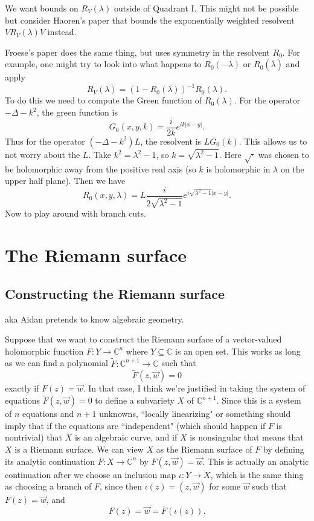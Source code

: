 \documentclass[12pt]{report}
\newcommand{\CC}{\mathbb{C}}
\theoremstyle{definition}
\begin{document}
We want bounds on $R_V(\lambda)$ outside of Quadrant I. This might not be possible but consider Haoren's paper that bounds the exponentially weighted resolvent $VR_V(\lambda)V$ instead.

Froese's paper does the same thing, but uses symmetry in the resolvent $R_0$.
For example, one might try to look into what happens to $R_0(-\lambda)$ or $R_0(\overline\lambda)$ and apply
$$R_V(\lambda) = (1 - R_0(\lambda))^{-1}R_0(\lambda).$$
To do this we need to compute the Green function of $R_0(\lambda)$. For the operator $-\Delta - k^2$, the green function is
$$G_0(x, y, k) = \frac{i}{2k}e^{ik|x-y|}.$$
Thus for the operator $(-\Delta - k^2)L$, the resolvent is $LG_0(k)$.
This allows us to not worry about the $L$.
Take $k^2 = \lambda^2 - 1$, so $k = \sqrt{\lambda^2 - 1}$. Here $\sqrt\cdot$ was chosen to be holomorphic away from the positive real axis (so $k$ is holomorphic in $\lambda$ on the upper half plane).
Then we have
$$R_0(x, y, \lambda) = L\frac{i}{2\sqrt{\lambda^2 - 1}}e^{i\sqrt{\lambda^2 - 1}|x-y|}.$$
Now to play around with branch cuts.


\chapter{The Riemann surface}
\section{Constructing the Riemann surface}
aka Aidan pretends to know algebraic geometry.

Suppose that we want to construct the Riemann surface of a vector-valued holomorphic function $F: Y \to \CC^n$ where $Y \subseteq \CC$ is an open set.
This works as long as we can find a polynomial $\widetilde F: \CC^{n+1} \to \CC$ such that
$$\widetilde F(z, \vec w) = 0$$
exactly if $F(z) = \vec w$. In that case, I think we're justified in taking the system of equations $\widetilde F(z, \vec w) = 0$ to define a subvariety $X$ of $\CC^{n+1}$.
Since this is a system of $n$ equations and $n + 1$ unknowns, ``locally linearizing" or something should imply that if the equations are ``independent" (which should happen if $F$ is nontrivial) that $X$ is an algebraic curve, and if $X$ is nonsingular that means that $X$ is a Riemann surface.
We can view $X$ as the Riemann surface of $F$ by defining its analytic continuation $\overline F: X \to \CC^n$ by $F(z, \vec w) = \vec w$.
This is actually an analytic continuation after we choose an inclusion map $\iota: Y \to X$, which is the same thing as choosing a branch of $F$, since then $\iota(z) = (z, \vec w)$ for some $\vec w$ such that $F(z) = \vec w$, and
$$F(z) = \vec w = \overline F(\iota(z)).$$
\end{document}

